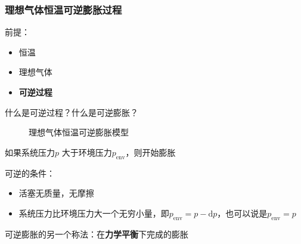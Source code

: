 \subsubsection*{理想气体恒温可逆膨胀过程}%
\label{subsub*:理想气体恒温可逆膨胀过程}
前提：
\begin{itemize}
    \item 恒温
    \item 理想气体
    \item \textbf{可逆过程}
\end{itemize}
\begin{question}
什么是可逆过程？什么是可逆膨胀？
\end{question}
\begin{figure}[ht!]
    \centering
    \caption{理想气体恒温可逆膨胀模型}
    \label{fig:理想气体恒温可逆膨胀模型}
\end{figure}
如果系统压力$p$ 大于环境压力$p_\text{env}$，则开始膨胀

可逆的条件：
\begin{itemize}
    \item 活塞无质量，无摩擦
    \item 系统压力比环境压力大一个无穷小量，即$p_\text{env} = p-\mathrm{d}p$，也可以说是$p_\text{env}=p$
    
\end{itemize}
可逆膨胀的另一个称法：在\textbf{力学平衡}下完成的膨胀

